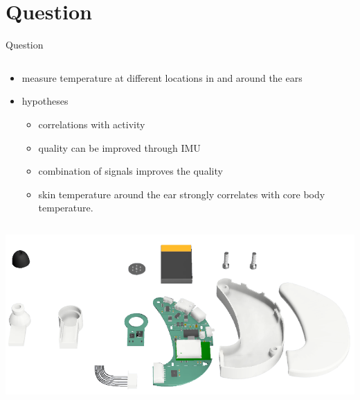 \documentclass[en]{sdqbeamer}
\begin{document}
\section{Question}
\begin{frame}[fragile]{Question}
    \begin{column}{0.50\textwidth}
        \begin{itemize}
            \item measure temperature at different locations in and around the ears
            \item hypotheses
            \begin{itemize}
                \item correlations with activity
                \item quality can be improved through IMU
                \item combination of signals improves the quality
                \item skin temperature around the ear strongly correlates with core body temperature.
            \end{itemize}
        \end{itemize}
    \end{column}
    \begin{column}{0.45\textwidth}
        \includegraphics[scale=0.26]{proposal-presentation/images/open_earable_new.png}
    \end{column}
\end{frame}
\end{document}
